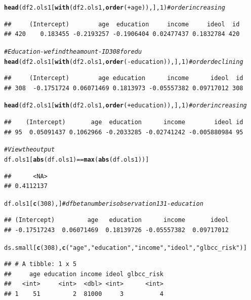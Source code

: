 \documentclass[11pt,openany]{book}
\makeatletter
\newcommand{\hlnum}[1]{\textcolor[rgb]{0.686,0.059,0.569}{#1}}%
\newcommand{\hlstr}[1]{\textcolor[rgb]{0.192,0.494,0.8}{#1}}%
\newcommand{\hlcom}[1]{\textcolor[rgb]{0.678,0.584,0.686}{\textit{#1}}}%
\newcommand{\hlopt}[1]{\textcolor[rgb]{0,0,0}{#1}}%
\newcommand{\hlstd}[1]{\textcolor[rgb]{0.345,0.345,0.345}{#1}}%
\newcommand{\hlkwd}[1]{\textcolor[rgb]{0.737,0.353,0.396}{\textbf{#1}}}%
\newenvironment{kframe}{%
 \def\at@end@of@kframe{}%
 \ifinner\ifhmode%
  \def\at@end@of@kframe{\end{minipage}}%
  \begin{minipage}{\columnwidth}%
 \fi\fi%
 \def\FrameCommand##1{\hskip\@totalleftmargin \hskip-\fboxsep
 \colorbox{shadecolor}{##1}\hskip-\fboxsep
     \hskip-\linewidth \hskip-\@totalleftmargin \hskip\columnwidth}%
 \MakeFramed {\advance\hsize-\width
   \@totalleftmargin\z@ \linewidth\hsize
   \@setminipage}}%
 {\par\unskip\endMakeFramed%
 \at@end@of@kframe}
\newenvironment{knitrout}{}{} %
\renewenvironment{knitrout}{\begin{singlespace}}{\end{singlespace}}
\makeatother
\begin{document}
\begin{knitrout}
\begin{kframe}
\begin{alltt}
\hlkwd{head}\hlstd{(df2.ols1[}\hlkwd{with}\hlstd{(df2.ols1,} \hlkwd{order}\hlstd{(}\hlopt{+}\hlstd{age)), ],} \hlnum{1}\hlstd{)} \hlcom{# order increasing}
\end{alltt}
\begin{verbatim}
##     (Intercept)        age  education     income     ideol  id
## 420    0.183455 -0.2193257 -0.1906404 0.02477437 0.1832784 420
\end{verbatim}
\begin{alltt}
\hlcom{#  Education - we find the amount - ID 308 for edu}
\hlkwd{head}\hlstd{(df2.ols1[}\hlkwd{with}\hlstd{(df2.ols1,} \hlkwd{order}\hlstd{(}\hlopt{-}\hlstd{education)), ],} \hlnum{1}\hlstd{)} \hlcom{# order declining}
\end{alltt}
\begin{verbatim}
##     (Intercept)        age education      income      ideol  id
## 308  -0.1751724 0.06071469 0.1813973 -0.05557382 0.09717012 308
\end{verbatim}
\begin{alltt}
\hlkwd{head}\hlstd{(df2.ols1[}\hlkwd{with}\hlstd{(df2.ols1,} \hlkwd{order}\hlstd{(}\hlopt{+}\hlstd{education)), ],} \hlnum{1}\hlstd{)} \hlcom{# order increasing}
\end{alltt}
\begin{verbatim}
##    (Intercept)       age  education      income        ideol id
## 95  0.05091437 0.1062966 -0.2033285 -0.02741242 -0.005880984 95
\end{verbatim}
\begin{alltt}
\hlcom{#  View the output}
\hlstd{df.ols1[}\hlkwd{abs}\hlstd{(df.ols1)} \hlopt{==} \hlkwd{max}\hlstd{(}\hlkwd{abs}\hlstd{(df.ols1))]}
\end{alltt}
\begin{verbatim}
##      <NA> 
## 0.4112137
\end{verbatim}
\begin{alltt}
\hlstd{df.ols1[}\hlkwd{c}\hlstd{(}\hlnum{308}\hlstd{),]} \hlcom{# dfbeta number is observation 131 - education}
\end{alltt}
\begin{verbatim}
## (Intercept)         age   education      income       ideol 
## -0.17517243  0.06071469  0.18139726 -0.05557382  0.09717012
\end{verbatim}
\begin{alltt}
\hlstd{ds.small[}\hlkwd{c}\hlstd{(}\hlnum{308}\hlstd{),} \hlkwd{c}\hlstd{(}\hlstr{"age"}\hlstd{,} \hlstr{"education"}\hlstd{,} \hlstr{"income"}\hlstd{,} \hlstr{"ideol"}\hlstd{,} \hlstr{"glbcc_risk"}\hlstd{)]}
\end{alltt}
\begin{verbatim}
## # A tibble: 1 x 5
##     age education income ideol glbcc_risk
##   <int>     <int>  <dbl> <int>      <int>
## 1    51         2  81000     3          4
\end{verbatim}
\end{kframe}
\end{knitrout}
\end{document}
